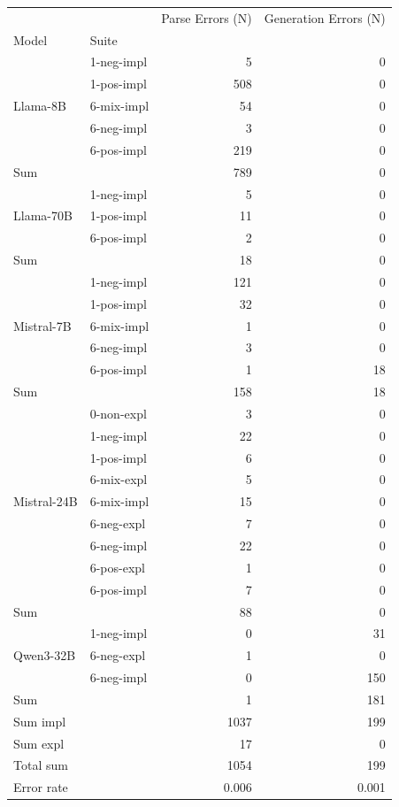 \begin{tabular}{llrr}
\toprule
 &  & Parse Errors (N) & Generation Errors (N) \\
Model & Suite &  &  \\
\cline{1-4}
\multirow[t]{5}{*}{Llama-8B} & 1-neg-impl & 5 & 0 \\
 & 1-pos-impl & 508 & 0 \\
 & 6-mix-impl & 54 & 0 \\
 & 6-neg-impl & 3 & 0 \\
 & 6-pos-impl & 219 & 0 \\
\cline{2-4}
 Sum & & 789 & 0 \\
\cline{1-4}
\multirow[t]{3}{*}{Llama-70B} & 1-neg-impl & 5 & 0 \\
 & 1-pos-impl & 11 & 0 \\
 & 6-pos-impl & 2 & 0 \\
 \cline{2-4}
  Sum & & 18 & 0 \\
\cline{1-4}
\multirow[t]{5}{*}{Mistral-7B} & 1-neg-impl & 121 & 0 \\
 & 1-pos-impl & 32 & 0 \\
 & 6-mix-impl & 1 & 0 \\
 & 6-neg-impl & 3 & 0 \\
 & 6-pos-impl & 1 & 18 \\
 \cline{2-4}
  Sum & & 158 & 18 \\
\cline{1-4}
\multirow[t]{9}{*}{Mistral-24B} & 0-non-expl & 3 & 0 \\
 & 1-neg-impl & 22 & 0 \\
 & 1-pos-impl & 6 & 0 \\
 & 6-mix-expl & 5 & 0 \\
 & 6-mix-impl & 15 & 0 \\
 & 6-neg-expl & 7 & 0 \\
 & 6-neg-impl & 22 & 0 \\
 & 6-pos-expl & 1 & 0 \\
 & 6-pos-impl & 7 & 0 \\
 \cline{2-4}
  Sum &  & 88 & 0 \\
\cline{1-4}
\multirow[t]{3}{*}{Qwen3-32B} & 1-neg-impl & 0 & 31 \\
 & 6-neg-expl & 1 & 0 \\
 & 6-neg-impl & 0 & 150 \\
 \cline{2-4}
  Sum & & 1 & 181 \\
\cline{1-4}
Sum impl & & 1037 & 199 \\
Sum expl & & 17 & 0 \\
Total sum & & 1054 & 199 \\
Error rate & & 0.006 & 0.001 \\
\bottomrule
\end{tabular}